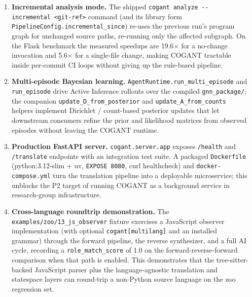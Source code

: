 \documentclass[
]{article}
\begin{document}
\begin{enumerate}
  approximate, and \textbf{3} divergent targets (of \textbf{23} total).
  The canonical
  \texttt{cogant/docs/evaluation/ROUNDTRIP\_IMPROVEMENT.md} documents
  the POLICY/CONTEXT fix trajectory; see §9, S01, S02 for tables.
\item
  \textbf{Incremental analysis mode.} The shipped
  \texttt{cogant\ analyze\ -\/-incremental\ \textless{}git-ref\textgreater{}}
  command (and its library form
  \texttt{PipelineConfig.incremental\_since}) re-uses the previous run's
  program graph for unchanged source paths, re-running only the affected
  subgraph. On the Flask benchmark the measured speedups are
  19.6\(\times\) for a no-change invocation and 5.6\(\times\) for a
  single-file change, making COGANT tractable inside per-commit CI loops
  without giving up the rule-based pipeline.
\item
  \textbf{Multi-episode Bayesian learning.}
  \texttt{AgentRuntime.run\_multi\_episode} and \texttt{run\_episode}
  drive Active Inference rollouts over the compiled
  \texttt{gnn\_package/}; the companion
  \texttt{update\_D\_from\_posterior} and
  \texttt{update\_A\_from\_counts} helpers implement Dirichlet /
  count-based posterior updates that let downstream consumers refine the
  prior and likelihood matrices from observed episodes without leaving
  the COGANT runtime.
\item
  \textbf{Production FastAPI server.} \texttt{cogant.server.app} exposes
  \texttt{/health} and \texttt{/translate} endpoints with an integration
  test suite. A packaged \texttt{Dockerfile} (python:3.12-slim + uv,
  \texttt{EXPOSE\ 8080}, curl healthcheck) and
  \texttt{docker-compose.yml} turn the translation pipeline into a
  deployable microservice; this unblocks the P2 target of running COGANT
  as a background service in research-group infrastructure.
\item
  \textbf{Cross-language roundtrip demonstration.} The
  \texttt{examples/zoo/13\_js\_observer} fixture exercises a JavaScript
  observer implementation (with optional \texttt{cogant{[}multilang{]}}
  and an installed grammar) through the forward pipeline, the reverse
  synthesizer, and a full AI cycle, recording a
  \texttt{role\_match\_score} of 1.0 on the forward-reverse-forward
  comparison when that path is enabled. This demonstrates that the
  tree-sitter-backed JavaScript parser plus the language-agnostic
  translation and statespace layers can round-trip a non-Python source
  language on the zoo regression set.
\end{enumerate}
\end{document}
